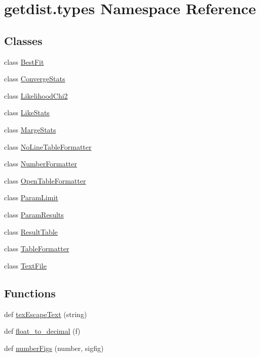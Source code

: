\hypertarget{namespacegetdist_1_1types}{}\section{getdist.\+types Namespace Reference}
\label{namespacegetdist_1_1types}
\subsection*{Classes}
\begin{DoxyCompactItemize}
\item 
class \mbox{\hyperlink{classgetdist_1_1types_1_1BestFit}{Best\+Fit}}
\item 
class \mbox{\hyperlink{classgetdist_1_1types_1_1ConvergeStats}{Converge\+Stats}}
\item 
class \mbox{\hyperlink{classgetdist_1_1types_1_1LikelihoodChi2}{Likelihood\+Chi2}}
\item 
class \mbox{\hyperlink{classgetdist_1_1types_1_1LikeStats}{Like\+Stats}}
\item 
class \mbox{\hyperlink{classgetdist_1_1types_1_1MargeStats}{Marge\+Stats}}
\item 
class \mbox{\hyperlink{classgetdist_1_1types_1_1NoLineTableFormatter}{No\+Line\+Table\+Formatter}}
\item 
class \mbox{\hyperlink{classgetdist_1_1types_1_1NumberFormatter}{Number\+Formatter}}
\item 
class \mbox{\hyperlink{classgetdist_1_1types_1_1OpenTableFormatter}{Open\+Table\+Formatter}}
\item 
class \mbox{\hyperlink{classgetdist_1_1types_1_1ParamLimit}{Param\+Limit}}
\item 
class \mbox{\hyperlink{classgetdist_1_1types_1_1ParamResults}{Param\+Results}}
\item 
class \mbox{\hyperlink{classgetdist_1_1types_1_1ResultTable}{Result\+Table}}
\item 
class \mbox{\hyperlink{classgetdist_1_1types_1_1TableFormatter}{Table\+Formatter}}
\item 
class \mbox{\hyperlink{classgetdist_1_1types_1_1TextFile}{Text\+File}}
\end{DoxyCompactItemize}
\subsection*{Functions}
\begin{DoxyCompactItemize}
\item 
def \mbox{\hyperlink{namespacegetdist_1_1types_a3ada89ff8f21a7f0e9d62c2c3b4607c4}{tex\+Escape\+Text}} (string)
\item 
def \mbox{\hyperlink{namespacegetdist_1_1types_a27cfb91bfa5e76b35f81fde56b8ce2ad}{float\+\_\+to\+\_\+decimal}} (f)
\item 
def \mbox{\hyperlink{namespacegetdist_1_1types_a4829adc4cab4c2f830294abfac22ecf7}{number\+Figs}} (number, sigfig)
\end{DoxyCompactItemize}


